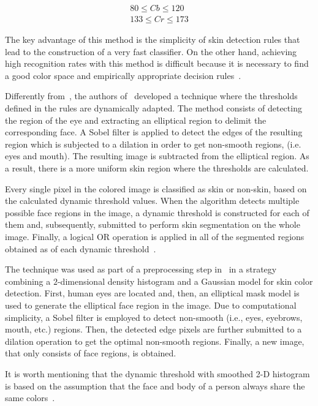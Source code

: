 \begin{align*}
80  \leq Cb \leq 120 \\
133 \leq Cr \leq 173
\end{align*}

The key advantage of this method is the simplicity of skin detection rules that lead to the construction of a very fast classifier. On the other hand, achieving high recognition rates with this method is difficult because it is necessary to find a good color space and empirically appropriate decision rules~\citep{vezhnevets:03}.

Differently from~\citet{kovac:03}, the authors of~\citet{yogarajah:11} developed a technique where the thresholds defined in the rules are dynamically adapted. The method consists of detecting the region of the eye and extracting an elliptical region to delimit the corresponding face. A Sobel filter is applied to detect the edges of the resulting region which is subjected to a dilation in order to get non-smooth regions, (i.e. eyes and mouth). The resulting image is subtracted from the elliptical region. As a result, there is a more uniform skin region where the thresholds are calculated.

Every single pixel in the colored image is classified as skin or non-skin, based on the calculated dynamic threshold values. When the algorithm detects multiple possible face regions in the image, a dynamic threshold is constructed for each of them and, subsequently, submitted to perform skin segmentation on the whole image. Finally, a logical OR operation is applied in all of the segmented regions obtained as of each dynamic threshold~\citep{yogarajah:11}.

The technique was used as part of a preprocessing step in~\citet{tan:12} in a strategy combining a $2$-dimensional density histogram and a Gaussian model for skin color detection. First, human eyes are located and, then, an elliptical mask model is used to generate the elliptical face region in the image. Due to computational simplicity, a Sobel filter is employed to detect non-smooth (i.e., eyes, eyebrows, mouth, etc.) regions. Then, the detected edge pixels are further submitted to a dilation operation to get the optimal non-smooth regions. Finally, a new image, that only consists of face regions, is obtained.

It is worth mentioning that the dynamic threshold with smoothed 2-D histogram is based on the assumption that the face and body of a person always share the same colors~\citep{tan:12}.

